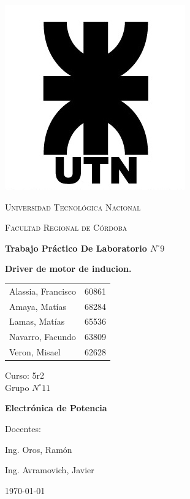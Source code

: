 \documentclass[11pt, a4paper]{article}
\begin{document}
\begin{titlepage}
 \centering
	\includegraphics[scale=0.80]{imagenes/LOGO.jpg} \par
 	\vspace{1cm}
 	{\scshape\LARGE Universidad Tecnológica Nacional \par}
 	{\scshape\large Facultad Regional de Córdoba \par}
 	\vspace{1cm}
	{\bfseries \Large Trabajo Práctico De Laboratorio $N^{\circ} 9$\par}
	{\bfseries \Large Driver de motor de inducion.\par}
 	\vspace{1.5cm}

	\begin{tabular}{ll}
		Alassia, Francisco		&	60861	\\
		Amaya, Matías			&	68284	\\
		Lamas, Matías			&	65536 	\\
		Navarro, Facundo		&	63809 	\\
		Veron, Misael			&	62628
	\end{tabular}
	
	\vspace{1cm}
	Curso: 5r2 \\
	Grupo $N^{\circ} 11$
 	\vfill
	{\bfseries \Large Electrónica de Potencia \par}

	\vspace{1.5cm}
	Docentes: \par
	Ing. Oros, Ramón \par
	Ing. Avramovich, Javier \par

 	\vfill
	{\large \today\par}
\end{titlepage}
	
\end{document}
